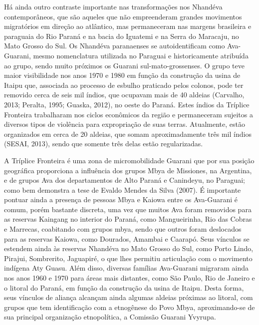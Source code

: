 \documentclass{article}
\begin{document}
H\'a ainda outro contraste importante nas transforma\c{c}\~oes nos
Nhand\'eva contempor\^aneos, que s\~ao aqueles que n\~ao empreenderam
grandes movimentos migrat\'orios em dire\c{c}\~ao ao atl\^antico, mas
permaneceram nas margens brasileira e paraguaia do Rio Paran\'a e na
bacia do Iguatemi e na Serra do Maracaju, no Mato Grosso do Sul. Os
Nhand\'eva paranaenses se autoidentificam como Ava-Guarani, mesmo
nomenclatura utilizada no Paraguai e historicamente atribu\'ida ao
grupo, sendo muito pr\'oximos os Guarani sul-mato-grossenses. O grupo
teve maior visibilidade nos anos 1970 e 1980 em fun\c{c}\~ao da
constru\c{c}\~ao da usina de Itaipu que, associada ao processo de
esbulho praticado pelos colonos, pode ter removido cerca de seis mil
\'indios, que ocupavam mais de 40 aldeias (Carvalho, 2013; Peralta,
1995; Guaska, 2012), no oeste do Paran\'a. Estes \'indios da Tr\'iplice
Fronteira trabalharam nos ciclos econ\^omicos da regi\~ao e
permaneceram sujeitos a diversos tipos de viol\^encia para
expropria\c{c}\~ao de suas terras. Atualmente, est\~ao organizados em
cerca de 20 aldeias, que somam aproximadamente tr\^es mil \'indios
(SESAI, 2013), sendo que somente tr\^es delas est\~ao regularizadas.

A Tr\'iplice Fronteira \'e uma zona de micromobilidade Guarani que por
sua posi\c{c}\~ao geogr\'afica proporciona a influ\^encia dos grupos
Mbya de Missiones, na Argentina, e de grupos Ava dos departamentos de
Alto Paran\'a e Canindeyu, no Paraguai; como bem demonstra a tese de
Evaldo Mendes da Silva (2007).  \'E importante pontuar ainda a
presen\c{c}a de pessoas Mbya e Kaiowa entre os Ava-Guarani \'e comum,
por\'em bastante discreta, uma vez que muitos Ava foram removidos para
as reservas Kaingang no interior do Paran\'a, como Mangueirinha, Rio
das Cobras e Marrecas, coabitando com grupos mbya, sendo que outros
foram deslocados para as reservas Kaiowa, como Dourados, Amambai e
Caarap\'o. Seus v\'inculos se estendem ainda \`as reservas Nhand\'eva
no Mato Grosso do Sul, como Porto Lindo, Pirajui, Sombrerito,
Jaguapir\'e, o que lhes permitiu articula\c{c}\~ao com o movimento
ind\'igena Aty Guasu. Al\'em disso, diversas fam\'ilias Ava-Guarani
migraram ainda nos anos 1960 e 1970 para \'areas mais distantes, como
S\~ao Paulo, Rio de Janeiro e o litoral do Paran\'a, em fun\c{c}\~ao da
constru\c{c}\~ao da usina de Itaipu. Desta forma, seus v\'inculos de
alian\c{c}a alcan\c{c}am ainda algumas aldeias pr\'oximas ao litoral,
com grupos que tem identifica\c{c}\~ao com a etnog\^enese do Povo Mbya,
aproximando-se de sua principal organiza\c{c}\~ao etnopol\'itica, a
Comiss\~ao Guarani Yvyrupa.
\end{document}
